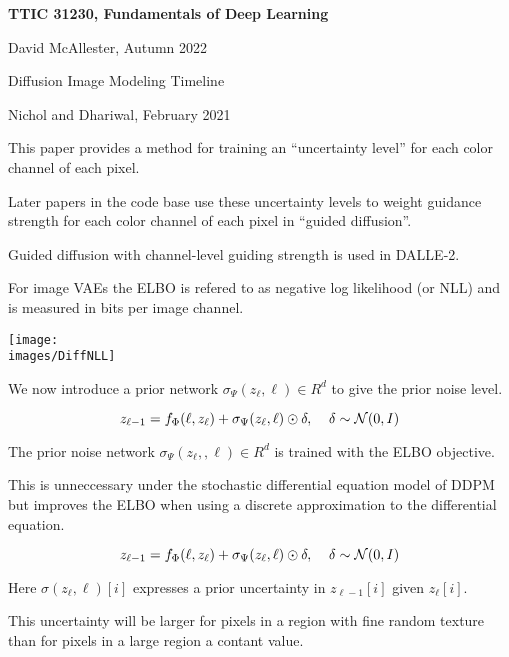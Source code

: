 





{\Huge

  \centerline{\bf TTIC 31230, Fundamentals of Deep Learning}
  \bigskip
  \centerline{David McAllester, Autumn 2022}
  \vfill
  \vfil
  \centerline{Diffusion Image Modeling Timeline}
  \vfill
  \vfill

{Nichol and Dhariwal, February 2021}

\vfill
This paper provides a method for training an ``uncertainty level'' for each color channel of each pixel.

\vfill
Later papers in the code base use these uncertainty levels to weight guidance strength for each color channel of each pixel in ``guided diffusion''.

\vfill
Guided diffusion with channel-level guiding strength is used in DALLE-2.


For image VAEs the ELBO is refered to as negative log likelihood (or NLL) and is measured in bits per image channel.

\vfill
\centerline{\texttt{[image: \\images/DiffNLL]}}



We now introduce a prior network $\sigma_\Psi(z_\ell,\ell) \in R^d$ to give the prior noise level.

$$z_{\ell-1} = f_\Phi(\ell,z_\ell) + {\sigma}_\Psi(z_\ell,\ell)\odot\delta,\;\;\;\;\delta \sim {\cal N}(0,I)$$

\vfill
The prior noise network $\sigma_\Psi(z_\ell,,\ell) \in R^d$ is trained with the ELBO objective.

\vfill
This is unneccessary under the stochastic differential equation model of DDPM but improves the ELBO when using a discrete approximation to the differential equation.



$$z_{\ell-1} = f_\Phi(\ell,z_\ell) + {\sigma}_\Psi(z_\ell,\ell)\odot\delta,\;\;\;\;\delta \sim {\cal N}(0,I)$$

\vfill
Here $\sigma(z_\ell,\ell)[i]$ expresses a prior uncertainty in $z_{\ell-1}[i]$ given $z_\ell[i]$.

\vfill
This uncertainty will be larger for pixels in a region with fine random texture than for pixels in a large region a contant value.

}
